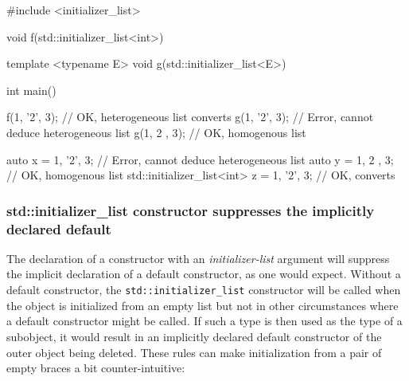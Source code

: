 \begin{emcppslisting}
#include <initializer_list>

void f(std::initializer_list<int>) {}

template <typename E>
void g(std::initializer_list<E>) {}

int main()
{
    f({1, '2', 3});  // OK, heterogeneous list converts
    g({1, '2', 3});  // Error, cannot deduce heterogeneous list
    g({1,  2 , 3});  // OK, homogenous list

    auto x = {1, '2', 3};  // Error, cannot deduce heterogeneous list
    auto y = {1,  2 , 3};  // OK, homogenous list
    std::initializer_list<int> z = {1, '2', 3};  // OK, converts
}
\end{emcppslisting}
    

\subsubsection[\lstinline!std::initializer_list! constructor suppresses the implicitly declared default]{{\SubsubsecCode std::initializer\_list} constructor suppresses the implicitly declared default}\label{std::initializer_list-constructor-suppresses-the-implicitly-declared-default}

The declaration of a constructor with an \emph{initializer-list}
argument will suppress the implicit declaration of a default
constructor, as one would expect. Without a default constructor, the
\lstinline!std::initializer_list! constructor will be called when the
object is initialized from an empty list but not in other circumstances
where a default constructor might be called. If such a type is then used
as the type of a subobject, it would result in an implicitly declared
default constructor of the outer object being deleted. These rules can
make initialization from a pair of empty braces a bit counter-intuitive:


